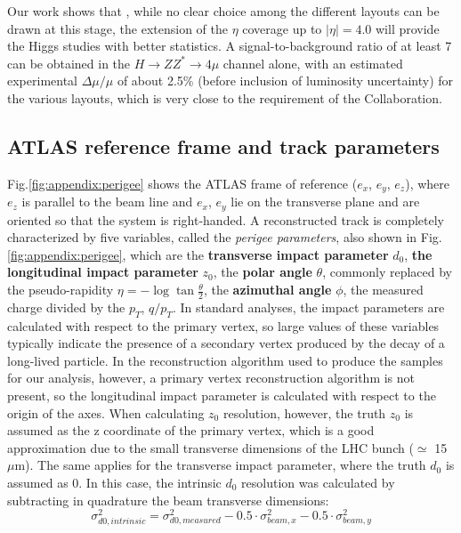 \documentclass[a4paper,twoside,12pt]{book}
\begin{document}
Our work shows that , while no clear choice among the different layouts can be drawn at this stage, the extension of the $\eta$ coverage up to $|\eta| = 4.0$ will provide the Higgs studies with better statistics. A signal-to-background ratio of at least 7 can be obtained in the $H \rightarrow ZZ^{*} \rightarrow 4\mu$ channel alone, with an estimated experimental $\Delta\mu/\mu$ of about 2.5\%  (before inclusion of luminosity uncertainty) for the various layouts, which is very close to the requirement of the Collaboration.

\clearpage

\begin{appendices}
\chapter{ATLAS reference frame and track parameters} \label{appendix:perigee}

Fig.\ref{fig:appendix:perigee} shows the ATLAS frame of reference ($e_{x}$, $e_{y}$, $e_{z}$), where $e_{z}$ is parallel to the beam line and $e_{x}$, $e_{y}$ lie on the
transverse plane and are oriented so that the system is right-handed. A reconstructed track is completely characterized by five variables, called the \textit{perigee parameters}, also shown in
Fig.\ref{fig:appendix:perigee}, which are the \textbf{transverse impact parameter} $d_{0}$, \textbf{the longitudinal impact parameter} $z_{0}$, the \textbf{polar angle} $\theta$, commonly replaced by the 
pseudo-rapidity $\eta = -\log{\tan{\frac{\theta}{2}}}$, the \textbf{azimuthal angle} $\phi$, the measured charge divided by the $p_{T}$, {\boldmath$q/p_{T}$}. In standard analyses, the impact parameters are calculated with respect to the primary vertex, so large values of these variables typically indicate the presence of a secondary 
vertex produced by the decay of a long-lived particle. In the reconstruction algorithm used to produce the samples for our analysis, however, a primary vertex reconstruction algorithm is not present, so the longitudinal impact parameter is calculated with 
respect to the origin of the axes. When calculating $z_{0}$ resolution, however, the truth $z_{0}$ is assumed as the z coordinate of the primary vertex, which is a
good approximation due to the small transverse dimensions of the LHC bunch ($\simeq$ 15 $\mu$m). The same applies for the transverse impact parameter, where the 
truth $d_{0}$ is assumed as 0. In this case, the intrinsic $d_{0}$ resolution was calculated by subtracting in quadrature the beam transverse dimensions:
\begin{equation*}
\text{$\sigma_{d0, intrinsic}^{2} = \sigma_{d0, measured}^{2} - 0.5 \cdot \sigma_{beam, x}^{2} - 0.5 \cdot \sigma_{beam, y}^{2}$}
\end{equation*}


\end{appendices}
\end{document}
